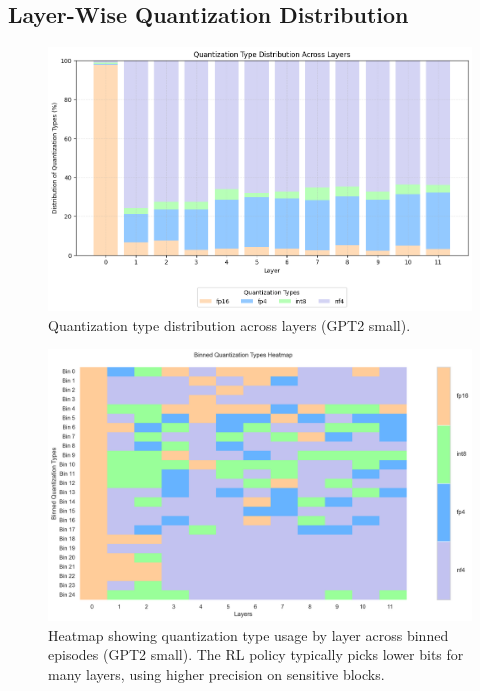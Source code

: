 \documentclass{article}
\begin{document}
	\subsection{Layer-Wise Quantization Distribution}
	\begin{figure}[ht]
		\centering
		\includegraphics[width=0.93\columnwidth]{images/gpt2-350-gae-ewa-rwd-v2/layer_distribution_plot.png}
		\vspace{-0.4em}
		\caption{\small Quantization type distribution across layers (GPT2 small).}
		\label{fig:bardist}
		\vspace{-0.5em}
	\end{figure}
	\begin{figure}[ht]
		\centering
		\includegraphics[width=0.93\columnwidth]{images/gpt2-250-gae-ewa-rwd-v1/binned_heatmap.png}
		\vspace{-0.4em}
		\caption{\small Heatmap showing quantization type usage by layer across binned episodes (GPT2 small). The RL policy typically picks lower bits for many layers, using higher precision on sensitive blocks.}
		\label{fig:bin_heatmap}
		\vspace{-0.5em}
	\end{figure}
\end{document}
